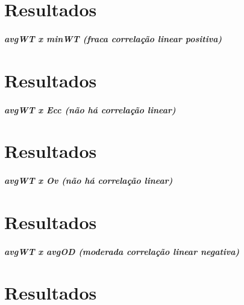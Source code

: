 \section*{Resultados}

\subparagraph*{avg\+WT x min\+WT (fraca correlação linear positiva)}

\subsection*{}





\section*{Resultados}

\subparagraph*{avg\+WT x Ecc (não há correlação linear)}

\subsection*{}





\section*{Resultados}

\subparagraph*{avg\+WT x Ov (não há correlação linear)}

\subsection*{}



 \section*{Resultados}

\subparagraph*{avg\+WT x avg\+OD (moderada correlação linear negativa)}

\subsection*{}



 \section*{Resultados}

